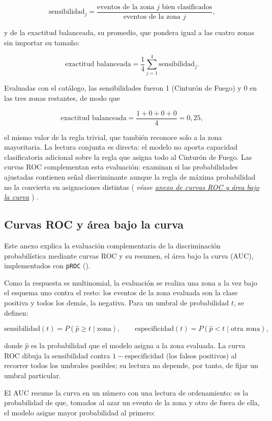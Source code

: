\documentclass[
  spanish,
  letterpaper,
  DIV=11,
  numbers=noendperiod]{scrartcl}
\newcommand{\asesoriaParenRef}[1]{%
  \textnormal{\textcolor{asesoriaTextColor}{(}}%
  {\hypersetup{linkcolor=asesoriaLinkColor,urlcolor=asesoriaLinkColor,citecolor=asesoriaLinkColor}\textcolor{asesoriaTextColor}{\emph{#1}}}%
  \textnormal{\textcolor{asesoriaTextColor}{)}}%
}
\begin{document}
\[
\text{sensibilidad}_j=\frac{\text{eventos de la zona } j \text{ bien clasificados}}{\text{eventos de la zona } j},
\]

y de la exactitud balanceada, su promedio, que pondera igual a las
cuatro zonas sin importar su tamaño:

\[
\text{exactitud balanceada}=\frac{1}{4}\sum_{j=1}^{4}\text{sensibilidad}_j.
\]

Evaluadas con el catálogo, las sensibilidades fueron 1 (Cinturón de
Fuego) y 0 en las tres zonas restantes, de modo que

\[
\text{exactitud balanceada}=\frac{1+0+0+0}{4}=0{,}25,
\]

el mismo valor de la regla trivial, que también reconoce solo a la zona
mayoritaria. La lectura conjunta es directa: el modelo no aporta
capacidad clasificatoria adicional sobre la regla que asigna todo al
Cinturón de Fuego. Las curvas ROC complementan esta evaluación: examinan
si las probabilidades ajustadas contienen señal discriminante aunque la
regla de máxima probabilidad no la convierta en asignaciones distintas
\asesoriaParenRef{véase \hyperref[sec-anexo-roc]{anexo de curvas ROC y área bajo la curva}}.

\subsection{Curvas ROC y área bajo la curva}\label{sec-anexo-roc}

Este anexo explica la evaluación complementaria de la discriminación
probabilística mediante curvas ROC y su resumen, el área bajo la curva
(AUC), implementados con \texttt{pROC} ().

Como la respuesta es multinomial, la evaluación se realiza una zona a la
vez bajo el esquema uno contra el resto: los eventos de la zona evaluada
son la clase positiva y todos los demás, la negativa. Para un umbral de
probabilidad \(t\), se definen:

\[
\text{sensibilidad}(t)=P(\hat p \geq t \mid \text{zona}),
\qquad
\text{especificidad}(t)=P(\hat p < t \mid \text{otra zona}),
\]

donde \(\hat p\) es la probabilidad que el modelo asigna a la zona
evaluada. La curva ROC dibuja la sensibilidad contra
\(1-\text{especificidad}\) (los falsos positivos) al recorrer todos los
umbrales posibles; su lectura no depende, por tanto, de fijar un umbral
particular.

El AUC resume la curva en un número con una lectura de ordenamiento: es
la probabilidad de que, tomados al azar un evento de la zona y otro de
fuera de ella, el modelo asigne mayor probabilidad al primero:
\end{document}
